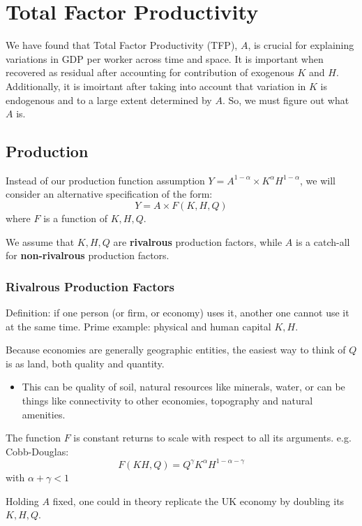 \documentclass[11pt]{article}
\begin{document}
\section{Total Factor Productivity}

We have found that Total Factor Productivity (TFP), $A$, is crucial for explaining variations in GDP per worker across time and space. It is important when recovered as residual after accounting for contribution of exogenous $K$ and $H$. Additionally, it is imoirtant after taking into account that variation in $K$ is endogenous and to a large extent determined by $A$. So, we must figure out what $A$ is.

\subsection{Production}

Instead of our production function assumption $Y = A^{1-\alpha} \times K^\alpha H^{1-\alpha}$, we will consider an alternative specification of the form:
\[Y = A \times F(K,H,Q)\]
where $F$ is a function of $K,H,Q$.

We assume that $K,H,Q$ are \textbf{rivalrous }production factors, while $A$ is a catch-all for \textbf{non-rivalrous} production factors.

\subsubsection{Rivalrous Production Factors}
Definition: if one person (or firm, or economy) uses it, another one cannot use it at the same time. Prime example: physical and human capital $K,H$.

Because economies are generally geographic entities, the easiest way to think of $Q$ is as land, both quality and quantity.
\begin{itemize}
    \item This can be quality of soil, natural resources like minerals, water, or can be things like connectivity to other economies, topography and natural amenities.
\end{itemize}

The function $F$ is constant returns to scale with respect to all its arguments. e.g. Cobb-Douglas:
\[F(KH,Q) = Q^\gamma K^\alpha H ^{1-\alpha-\gamma}\]
with $\alpha + \gamma <1$

\begin{intu}
    Holding $A$ fixed, one could in theory replicate the UK economy by doubling its $K,H,Q$.
\end{intu}
\end{document}
